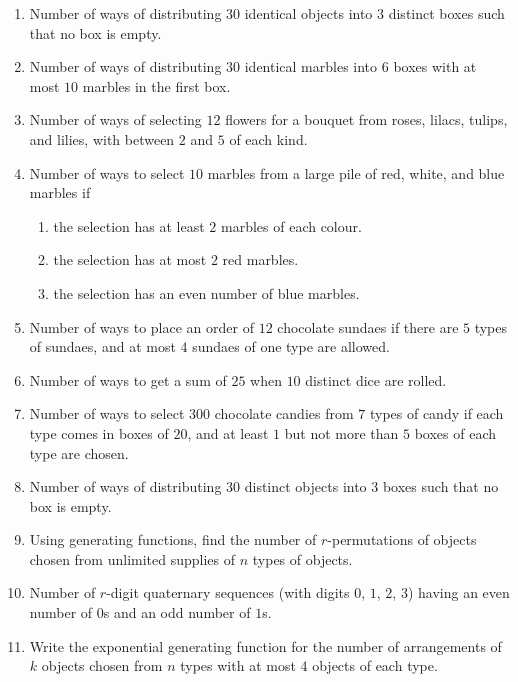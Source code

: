 \documentclass[svgnames]{amsart}
\begin{document}
\begin{enumerate}[leftmargin=*]
\item Number of ways of distributing $30$ identical objects into $3$ distinct boxes such that no box is empty.

\item Number of ways of distributing $30$ identical marbles into $6$ boxes with at most $10$ marbles in the first box.

\item Number of ways of selecting $12$ flowers for a bouquet from roses, lilacs, tulips, and lilies, with between $2$ and $5$ of each kind.

\item Number of ways to select $10$ marbles from a large pile of red, white, and blue marbles if
\begin{enumerate}[label=(\roman*)]
	\item the selection has at least $2$ marbles of each colour.
	\item the selection has at most $2$ red marbles.
	\item the selection has an even number of blue marbles.
\end{enumerate}

\item Number of ways to place an order of $12$ chocolate sundaes if there are $5$ types of sundaes, and at most $4$ sundaes of one type are allowed.

\item Number of ways to get a sum of $25$ when $10$ distinct dice are rolled.

\item Number of ways to select $300$ chocolate candies from $7$ types of candy if each type comes in boxes of $20$, and at least $1$ but not more than $5$ boxes of each type are chosen.

\item Number of ways of distributing $30$ distinct objects into $3$ boxes such that no box is empty.

\item Using generating functions, find the number of $r$-permutations of objects chosen from unlimited supplies of $n$ types of objects.

\item Number of $r$-digit quaternary sequences (with digits $0$, $1$, $2$, $3$) having an even number of $0$s and an odd number of $1$s.

\item Write the exponential generating function for the number of arrangements of $k$ objects chosen from $n$ types with at most $4$ objects of each type.


\end{enumerate}
\end{document}
